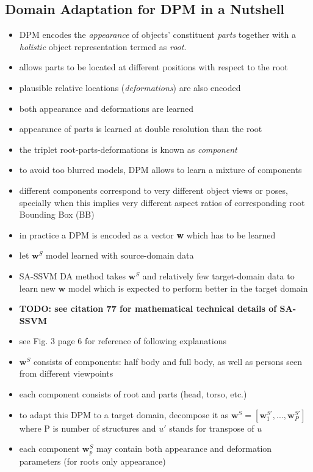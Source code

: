 \documentclass[]{article}
\newcommand{\todo}[1]{{\color{red}\bf{TODO: #1}}}
\begin{document}
\subsection{Domain Adaptation for DPM in a Nutshell}
\begin{itemize}
	\item DPM encodes the \textit{appearance} of objects' constituent \textit{parts} together with a \textit{holistic} object representation termed as \textit{root}.
		\item allows parts to be located at different positions with respect to the root
	\item plausible relative locations (\textit{deformations}) are also encoded
	\item both appearance and deformations are learned
	\item appearance of parts is learned at double resolution than the root
	\item the triplet root-parts-deformations is known as \textit{component}
	\item to avoid too blurred models, DPM allows to learn a mixture of components
	\item different components correspond to very different object views or poses, specially when this implies very different aspect ratios of corresponding root Bounding Box (BB)
	\item in practice a DPM is encoded as a vector \textbf{w} which has to be learned
	\item let $\mathbf{w}^S$ model learned with source-domain data
	\item SA-SSVM DA method takes $\mathbf{w}^S$ and relatively few target-domain data to learn new $\mathbf{w}$ model which is expected to perform better in the target domain
	\item \todo{see citation 77 for mathematical technical details of SA-SSVM}
	\item see Fig. 3 page 6 for reference of following explanations
	\item $\mathbf{w}^S$ consists of components: half body and full body, as well as persons seen from different viewpoints
	\item each component consists of root and parts (head, torso, etc.)
	\item to adapt this DPM to a target domain, decompose it as $\mathbf{w}^S = [\mathbf{w}_1^{S'}, ..., \mathbf{w}_P^{S'}]$ where P is number of structures and $u'$ stands for transpose of $u$
	\item each component $\mathbf{w}_p^S$ may contain both appearance and deformation parameters (for roots only appearance)

\end{itemize}
\end{document}
